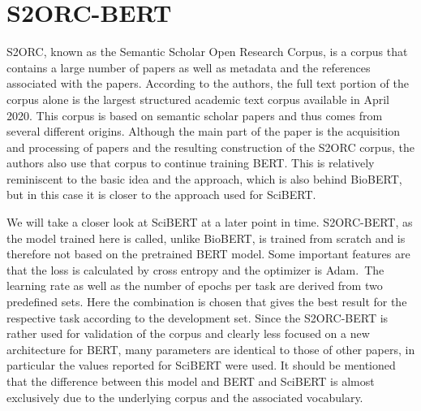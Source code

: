 	\color{red}
\section{S2ORC-BERT}
S2ORC, known as the Semantic Scholar Open Research Corpus, is a corpus that contains a large number of papers as well as metadata and the references associated with the papers. According to the authors, the full text portion of the corpus alone is the largest structured academic text corpus available in April 2020. This corpus is based on semantic scholar papers and thus comes from several different origins. Although the main part of the paper is the acquisition and processing of papers and the resulting construction of the S2ORC corpus, the authors also use that corpus to continue training BERT. This is relatively reminiscent to the basic idea and the approach, which is also behind BioBERT, but in this case it is closer to the approach used for SciBERT. 

We will take a closer look at SciBERT at a later point in time. S2ORC-BERT, as the model trained here is called, unlike BioBERT, is trained from scratch and is therefore not based on the pretrained BERT model. Some important features are that the loss is calculated by cross entropy and the optimizer is Adam. The learning rate as well as the number of epochs per task are derived from two predefined sets. Here the combination is chosen that gives the best result for the respective task according to the development set. Since the S2ORC-BERT is rather used for validation of the corpus and clearly less focused on a new architecture for BERT, many parameters are identical to those of other papers, in particular the values reported for SciBERT were used. It should be mentioned that the difference between this model and BERT and SciBERT is almost exclusively due to the underlying corpus and the associated vocabulary.  
	\color{black}



